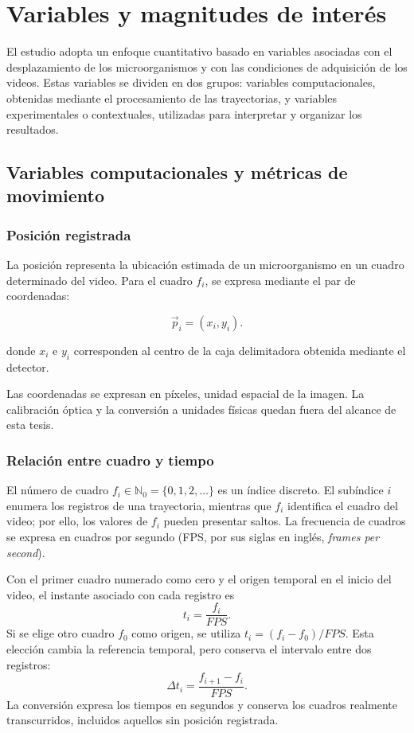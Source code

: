 \section{Variables y magnitudes de interés}

El estudio adopta un enfoque cuantitativo basado en variables asociadas con el desplazamiento de los microorganismos y con las condiciones de adquisición de los videos. Estas variables se dividen en dos grupos: variables computacionales, obtenidas mediante el procesamiento de las trayectorias, y variables experimentales o contextuales, utilizadas para interpretar y organizar los resultados.

\subsection{Variables computacionales y métricas de movimiento}

\subsubsection{Posición registrada}

La posición representa la ubicación estimada de un microorganismo en un cuadro determinado del video. Para el cuadro $f_i$, se expresa mediante el par de coordenadas:

\nopagebreak[4]
\[
\vec{p}_i=(x_i,y_i).
\]

donde $x_i$ e $y_i$ corresponden al centro de la caja delimitadora obtenida mediante el detector.

Las coordenadas se expresan en píxeles, unidad espacial de la imagen. La calibración óptica y la conversión a unidades físicas quedan fuera del alcance de esta tesis.

\subsubsection{Relación entre cuadro y tiempo}

El número de cuadro $f_i\in\mathbb{N}_0=\{0,1,2,\ldots\}$ es un índice discreto. El subíndice $i$ enumera los registros de una trayectoria, mientras que $f_i$ identifica el cuadro del video; por ello, los valores de $f_i$ pueden presentar saltos. La frecuencia de cuadros se expresa en cuadros por segundo (FPS, por sus siglas en inglés, \emph{frames per second}).

Con el primer cuadro numerado como cero y el origen temporal en el inicio del video, el instante asociado con cada registro es
\[
t_i=\frac{f_i}{FPS}.
\]
Si se elige otro cuadro $f_0$ como origen, se utiliza $t_i=(f_i-f_0)/FPS$. Esta elección cambia la referencia temporal, pero conserva el intervalo entre dos registros:
\[
\Delta t_i=\frac{f_{i+1}-f_i}{FPS}.
\]
La conversión expresa los tiempos en segundos y conserva los cuadros realmente transcurridos, incluidos aquellos sin posición registrada.


